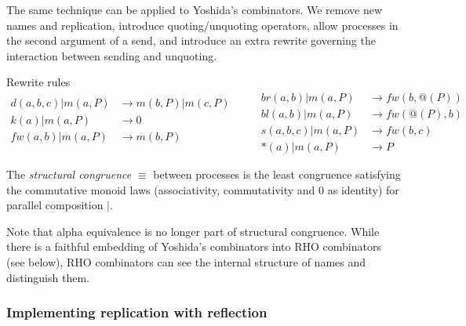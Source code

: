 \documentclass{llncs}
\makeatletter
\newcommand{\pzero}{\mathbin{0}}
\newcommand{\scong}{\mathbin{\equiv}}
\newcommand{\quotep}[1]{\mathsf{@}#1}
\newcommand{\bc}{\mathbin{\mathbf{::=}}}
\newcommand{\bm}{\mathbin{\mathbf\mid}}
\newcommand{\red}{\rightarrow}
\makeatother
\begin{document}
The same technique can be applied to Yoshida's combinators. We remove
new names and replication, introduce quoting/unquoting operators,
allow processes in the second argument of a send, and introduce an
extra rewrite governing the interaction between sending and unquoting.


Rewrite rules
\[\begin{array}{rl}
  d(a,b,c) | m(a,P) & \red m(b,P) | m(c,P) \\
  k(a) | m(a,P) & \red 0 \\
  fw(a,b) | m(a,P) & \red m(b,P) \\
\end{array} \quad \quad
\begin{array}{rl}
  br(a,b) | m(a,P) & \red fw(b,@(P)) \\
  bl(a,b) | m(a,P) & \red fw(@(P),b) \\
  s(a,b,c) | m(a,P) & \red fw(b,c) \\
  *(a) | m(a,P) & \red P
\end{array}\]

\begin{definition}
  The {\em structural congruence} $\equiv$
  between processes \cite{SangiorgiWalker} is the least congruence
  satisfying the commutative monoid laws
  (associativity, commutativity and $\pzero$ as identity) for parallel
  composition $|$.
\end{definition}

Note that alpha equivalence is no longer part of structural congruence.  While there is a faithful embedding of Yoshida's combinators into RHO combinators (see below), RHO combinators can see the internal structure of names and distinguish them.

\subsubsection{Implementing replication with reflection}
\end{document}
